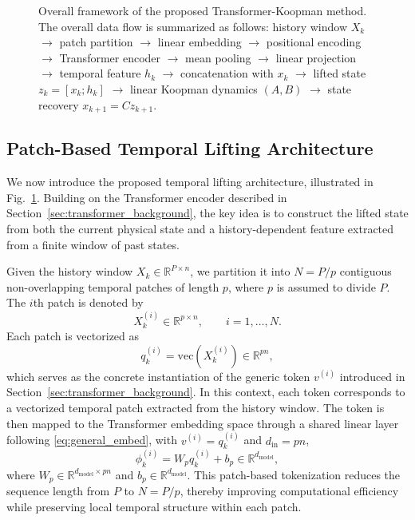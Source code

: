 \documentclass[journal]{IEEEtran}
\begin{document}
\begin{figure}[!t]
    \centering
    \caption{Overall framework of the proposed Transformer-Koopman method. The overall data flow is summarized as follows: history window $X_k$ $\rightarrow$ patch partition $\rightarrow$ linear embedding $\rightarrow$ positional encoding $\rightarrow$ Transformer encoder $\rightarrow$ mean pooling $\rightarrow$ linear projection $\rightarrow$ temporal feature $h_k$ $\rightarrow$ concatenation with $x_k$ $\rightarrow$ lifted state $z_k=[x_k;h_k]$ $\rightarrow$ linear Koopman dynamics $(A,B)$ $\rightarrow$ state recovery $x_{k+1}=Cz_{k+1}$.}
    \label{fig:framework}
\end{figure}

\subsection{Patch-Based Temporal Lifting Architecture}
\label{sec:temporal_lifting}

We now introduce the proposed temporal lifting architecture, illustrated in Fig.~\ref{fig:framework}. Building on the Transformer encoder described in Section~\ref{sec:transformer_background}, the key idea is to construct the lifted state from both the current physical state and a history-dependent feature extracted from a finite window of past states.

Given the history window $X_k \in \mathbb{R}^{P \times n}$, we partition it into $N = P/p$ contiguous non-overlapping temporal patches of length $p$, where $p$ is assumed to divide $P$. The $i$th patch is denoted by
\begin{equation}
    X_k^{(i)} \in \mathbb{R}^{p \times n}, \qquad i=1,\ldots,N.
\end{equation}
Each patch is vectorized as
\begin{equation}
    q_k^{(i)} = \mathrm{vec}(X_k^{(i)}) \in \mathbb{R}^{pn},
    \label{eq:patch_vec}
\end{equation}
which serves as the concrete instantiation of the generic token $v^{(i)}$ introduced in Section~\ref{sec:transformer_background}. In this context, each token corresponds to a vectorized temporal patch extracted from the history window. The token is then mapped to the Transformer embedding space through a shared linear layer following \eqref{eq:general_embed}, with $v^{(i)} = q_k^{(i)}$ and $d_{\mathrm{in}} = pn$,
\begin{equation}
    \phi_k^{(i)} = W_p q_k^{(i)} + b_p \in \mathbb{R}^{d_{\mathrm{model}}},
    \label{eq:patch_embedding}
\end{equation}
where $W_p \in \mathbb{R}^{d_{\mathrm{model}} \times pn}$ and $b_p \in \mathbb{R}^{d_{\mathrm{model}}}$. This patch-based tokenization reduces the sequence length from $P$ to $N=P/p$, thereby improving computational efficiency while preserving local temporal structure within each patch.
\end{document}
